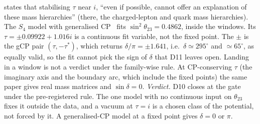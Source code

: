states that stabilising $\tau$ near $i$, ``even if possible, cannot offer an explanation of these mass
hierarchies'' (there, the charged-lepton and quark mass hierarchies). The $S_4$ model with generalised CP~\cite{nppt2019} fits $\sin^2\theta_{23}=0.4862$, inside
the windows. Its $\tau=\pm0.09922+1.016i$ is a continuous fit variable, not the fixed point. The $\pm$ is the
gCP pair $(\tau,-\tau^*)$, which returns $\delta/\pi=\pm1.641$, i.e.\ $\delta\simeq295^\circ$ and
$\simeq65^\circ$, as equally valid, so the fit cannot pick the sign of $\delta$ that D11 leaves open.
Landing in a window is not a verdict under the family-wise rule. At CP-conserving $\tau$ (the imaginary
axis and the boundary arc, which include the fixed points) the same paper gives real mass matrices
and $\sin\delta=0$.\quad
\emph{Verdict.} D10 closes at the gate under the pre-registered rule. The one model with no
continuous input on $\theta_{23}$ fixes it outside the data, and a vacuum at $\tau=i$ is a chosen class of
the potential, not forced by it. A generalised-CP model at a fixed point gives $\delta=0$ or $\pi$.


